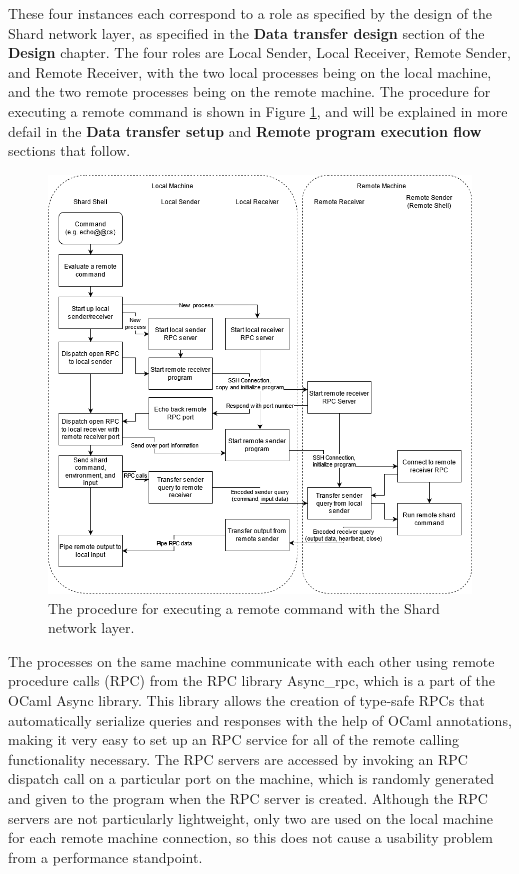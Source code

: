 \documentclass[twoside]{report}
\begin{document}
These four instances each correspond to a role as specified by the design of the Shard network layer, as specified in the \textbf{Data transfer design} section of the \textbf{Design} chapter.
The four roles are Local Sender, Local Receiver, Remote Sender, and Remote Receiver, with the two local processes being on the local machine, and the two remote processes being on the remote machine.
The procedure for executing a remote command is shown in Figure \ref{fig:network_layer_impl}, and will be explained in more defail in the \textbf{Data transfer setup} and \textbf{Remote program execution flow} sections that follow.

\begin{figure}[h]
  \begin{center}
    \includegraphics[scale=0.5]{img/shard_protocol_impl.png}
    \caption{The procedure for executing a remote command with the Shard network layer.}
    \label{fig:network_layer_impl}
  \end{center}
\end{figure}

The processes on the same machine communicate with each other using remote procedure calls (RPC) from the RPC library Async\_rpc, which is a part of the OCaml Async library.
This library allows the creation of type-safe RPCs that automatically serialize queries and responses with the help of OCaml annotations, making it very easy to set up an RPC service for all of the remote calling functionality necessary.
The RPC servers are accessed by invoking an RPC dispatch call on a particular port on the machine, which is randomly generated and given to the program when the RPC server is created.
Although the RPC servers are not particularly lightweight, only two are used on the local machine for each remote machine connection, so this does not cause a usability problem from a performance standpoint.
\end{document}

